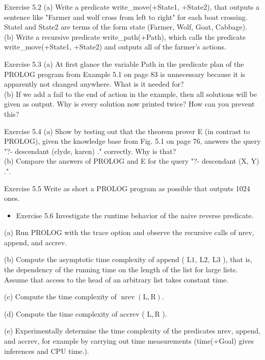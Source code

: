 \documentclass[10pt]{book}
\begin{document}
Exercise 5.2
(a) Write a predicate write\_move(+State1, +State2), that outputs a sentence like "Farmer and wolf cross from left to right" for each boat crossing. Statel and State2 are terms of the form state (Farmer, Wolf, Goat, Cabbage).\\
(b) Write a recursive predicate write\_path(+Path), which calls the predicate write\_move(+State1, +State2) and outputs all of the farmer's actions.

Exercise 5.3
(a) At first glance the variable Path in the predicate plan of the PROLOG program from Example 5.1 on page 83 is unnecessary because it is apparently not changed anywhere. What is it needed for?\\
(b) If we add a fail to the end of action in the example, then all solutions will be given as output. Why is every solution now printed twice? How can you prevent this?

Exercise 5.4
(a) Show by testing out that the theorem prover E (in contrast to PROLOG), given the knowledge base from Fig. 5.1 on page 76, answers the query "?- descendant (clyde, karen) ." correctly. Why is that?\\
(b) Compare the answers of PROLOG and E for the query "?- descendant (X, Y) .".

Exercise 5.5 Write as short a PROLOG program as possible that outputs 1024 ones.

\begin{itemize}
  \item Exercise 5.6 Investigate the runtime behavior of the naive reverse predicate.\\
\end{itemize}
\item (a) Run PROLOG with the trace option and observe the recursive calls of nrev, append, and accrev.
\item (b) Compute the asymptotic time complexity of append ( $\mathrm{L} 1, \mathrm{~L} 2, \mathrm{~L} 3$ ), that is, the dependency of the running time on the length of the list for large lists. Assume that access to the head of an arbitrary list takes constant time.
\item (c) Compute the time complexity of $\operatorname{nrev}(\mathrm{L}, \mathrm{R})$.
\item (d) Compute the time complexity of accrev ( $\mathrm{L}, \mathrm{R}$ ).
\item (e) Experimentally determine the time complexity of the predicates nrev, append, and accrev, for example by carrying out time measurements (time(+Goal) gives inferences and CPU time.).
\end{document}
